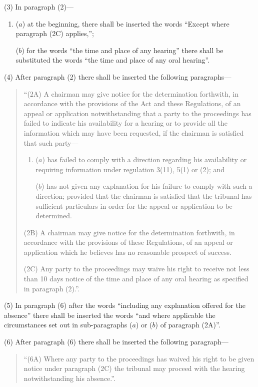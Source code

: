 \documentclass[12pt,a4paper]{article}
\begin{document}
(3) In paragraph (2)—
\begin{enumerate}\item[]
($a$) at the beginning, there shall be inserted the words “Except where paragraph (2C) applies,”;

($b$) for the words “the time and place of any hearing” there shall be substituted the words “the time and place of any oral hearing”.
\end{enumerate}

(4) After paragraph (2) there shall be inserted the following paragraphs—
\begin{quotation}
“(2A) A chairman may give notice for the determination forthwith, in accordance with the provisions of the Act and these Regulations, of an appeal or application notwithstanding that a party to the proceedings has failed to indicate his availability for a hearing or to provide all the information which may have been requested, if the chairman is satisfied that such party—
\begin{enumerate}\item[]
($a$) has failed to comply with a direction regarding his availability or requiring information under regulation 3(11), 5(1) or (2); and

($b$) has not given any explanation for his failure to comply with such a direction; provided that the chairman is satisfied that the tribunal has sufficient particulars in order for the appeal or application to be determined.
\end{enumerate}

(2B) A chairman may give notice for the determination forthwith, in accordance with the provisions of these Regulations, of an appeal or application which he believes has no reasonable prospect of success.

(2C) Any party to the proceedings may waive his right to receive not less than 10 days notice of the time and place of any oral hearing as specified in paragraph (2).”.
\end{quotation}

(5) In paragraph (6) after the words “including any explanation offered for the absence” there shall be inserted the words “and where applicable the circumstances set out in sub-paragraphs ($a$) or ($b$) of paragraph (2A)”.

(6) After paragraph (6) there shall be inserted the following paragraph—
\begin{quotation}
“(6A) Where any party to the proceedings has waived his right to be given notice under paragraph (2C) the tribunal may proceed with the hearing notwithstanding his absence.”.
\end{quotation}
\end{document}
